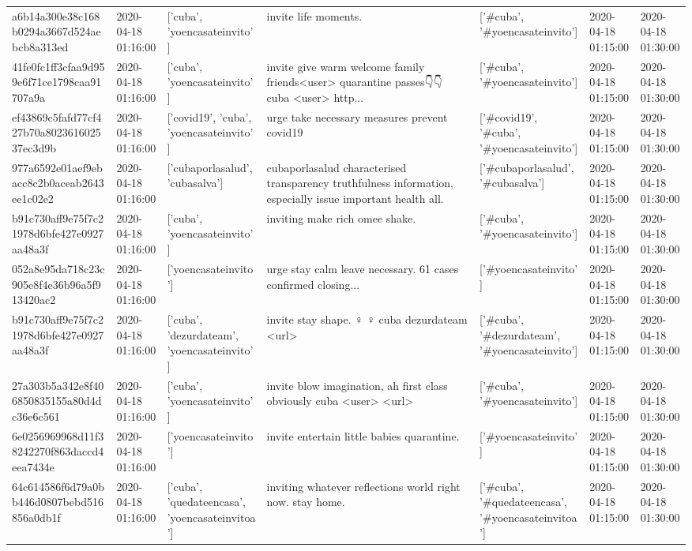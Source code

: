 \begin{tabular}{lllllll}
a6b14a300e38c168b0294a3667d524aebcb8a313ed & 2020-04-18 01:16:00 & ['cuba', 'yoencasateinvito'] & invite life moments. & ['#cuba', '#yoencasateinvito'] & 2020-04-18 01:15:00 & 2020-04-18 01:30:00 \\
41fe0fc1ff3cfaa9d959e6f71ce1798caa91707a9a & 2020-04-18 01:16:00 & ['cuba', 'yoencasateinvito'] & invite give warm welcome family friends<user> quarantine passes👇👇 cuba <user> http... & ['#cuba', '#yoencasateinvito'] & 2020-04-18 01:15:00 & 2020-04-18 01:30:00 \\
ef43869c5fafd77cf427b70a802361602537ec3d9b & 2020-04-18 01:16:00 & ['covid19', 'cuba', 'yoencasateinvito'] & urge take necessary measures prevent covid19 & ['#covid19', '#cuba', '#yoencasateinvito'] & 2020-04-18 01:15:00 & 2020-04-18 01:30:00 \\
977a6592e01aef9ebacc8c2b0aceab2643ee1c02e2 & 2020-04-18 01:16:00 & ['cubaporlasalud', 'cubasalva'] & cubaporlasalud characterised transparency truthfulness information, especially issue important health all. & ['#cubaporlasalud', '#cubasalva'] & 2020-04-18 01:15:00 & 2020-04-18 01:30:00 \\
b91c730aff9e75f7c21978d6bfe427e0927aa48a3f & 2020-04-18 01:16:00 & ['cuba', 'yoencasateinvito'] & inviting make rich omee shake. & ['#cuba', '#yoencasateinvito'] & 2020-04-18 01:15:00 & 2020-04-18 01:30:00 \\
052a8e95da718c23c905e8f4e36b96a5f913420ac2 & 2020-04-18 01:16:00 & ['yoencasateinvito'] & urge stay calm leave necessary. 61 cases confirmed closing... & ['#yoencasateinvito'] & 2020-04-18 01:15:00 & 2020-04-18 01:30:00 \\
b91c730aff9e75f7c21978d6bfe427e0927aa48a3f & 2020-04-18 01:16:00 & ['cuba', 'dezurdateam', 'yoencasateinvito'] & invite stay shape. ♀️ ♀️ cuba dezurdateam <url> & ['#cuba', '#dezurdateam', '#yoencasateinvito'] & 2020-04-18 01:15:00 & 2020-04-18 01:30:00 \\
27a303b5a342e8f406850835155a80d4dc36e6c561 & 2020-04-18 01:16:00 & ['cuba', 'yoencasateinvito'] & invite blow imagination, ah first class obviously cuba <user> <url> & ['#cuba', '#yoencasateinvito'] & 2020-04-18 01:15:00 & 2020-04-18 01:30:00 \\
6e0256969968d11f38242270f863daccd4eea7434e & 2020-04-18 01:16:00 & ['yoencasateinvito'] & invite entertain little babies quarantine. & ['#yoencasateinvito'] & 2020-04-18 01:15:00 & 2020-04-18 01:30:00 \\
64c614586f6d79a0bb446d0807bebd516856a0db1f & 2020-04-18 01:16:00 & ['cuba', 'quedateencasa', 'yoencasateinvitoa'] & inviting whatever reflections world right now. stay home. & ['#cuba', '#quedateencasa', '#yoencasateinvitoa'] & 2020-04-18 01:15:00 & 2020-04-18 01:30:00 \\

\end{tabular}
